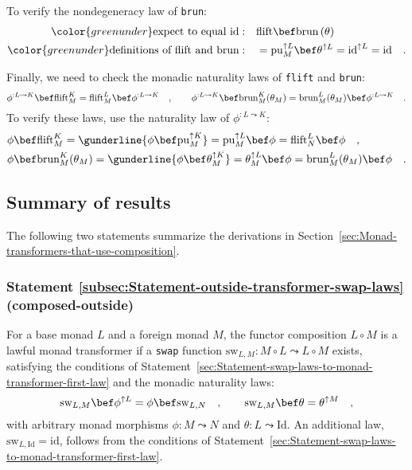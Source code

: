 To verify the nondegeneracy law of \lstinline!brun!:
\begin{align*}
{\color{greenunder}\text{expect to equal }\text{id}:}\quad & \text{flift}\bef\text{brun}\left(\theta\right)\\
{\color{greenunder}\text{definitions of }\text{flift}\text{ and }\text{brun}:}\quad & =\text{pu}_{M}^{\uparrow L}\bef\theta^{\uparrow L}=\text{id}^{\uparrow L}=\text{id}\quad.
\end{align*}

Finally, we need to check the monadic naturality laws of \lstinline!flift!
and \lstinline!brun!:
\[
\phi^{:L\leadsto K}\bef\text{flift}_{M}^{K}=\text{flift}_{M}^{L}\bef\phi^{:L\leadsto K}\quad,\quad\quad\phi^{:L\leadsto K}\bef\text{brun}_{M}^{K}(\theta_{M})=\text{brun}_{M}^{L}(\theta_{M})\bef\phi^{:L\leadsto K}\quad.
\]
To verify these laws, use the naturality law of $\phi^{:L\leadsto K}$:
\begin{align*}
 & \phi\bef\text{flift}_{M}^{K}=\gunderline{\phi\bef\text{pu}_{M}^{\uparrow K}}=\text{pu}_{M}^{\uparrow L}\bef\phi=\text{flift}_{N}^{L}\bef\phi\quad,\\
 & \phi\bef\text{brun}_{M}^{K}(\theta_{M})=\gunderline{\phi\bef\theta_{M}^{\uparrow K}}=\theta_{M}^{\uparrow L}\bef\phi=\text{brun}_{M}^{L}(\theta_{M})\bef\phi\quad.
\end{align*}


\subsection{Summary of results}

The following two statements summarize the derivations in Section~\ref{sec:Monad-transformers-that-use-composition}.

\subsubsection{Statement \label{subsec:Statement-outside-transformer-swap-laws}\ref{subsec:Statement-outside-transformer-swap-laws}
(composed-outside)}

For a base monad $L$ and a foreign monad $M$, the functor composition
$L\circ M$ is a lawful monad transformer if a \lstinline!swap! function
$\text{sw}_{L,M}:M\circ L\leadsto L\circ M$ exists, satisfying the
conditions of Statement~\ref{sec:Statement-swap-laws-to-monad-transformer-first-law}
and the monadic naturality laws:
\[
\text{sw}_{L,M}\bef\phi^{\uparrow L}=\phi\bef\text{sw}_{L,N}\quad,\quad\quad\text{sw}_{L,M}\bef\theta=\theta^{\uparrow M}\quad,
\]
with arbitrary monad morphisms $\phi:M\leadsto N$ and $\theta:L\leadsto\text{Id}$.
An additional law, $\text{sw}_{L,\text{Id}}=\text{id}$, follows from
the conditions of Statement~\ref{sec:Statement-swap-laws-to-monad-transformer-first-law}.

